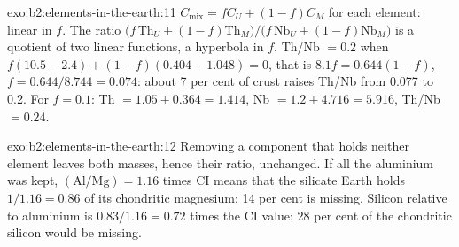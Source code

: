 \begin{solution}{exo:b2:elements-in-the-earth:11}
$C_{\mathrm{mix}} = fC_U + (1-f)C_M$ for each element: linear in $f$. The ratio
$\bigl(f\,\mathrm{Th}_U + (1-f)\mathrm{Th}_M\bigr)/\bigl(f\,\mathrm{Nb}_U +
(1-f)\mathrm{Nb}_M\bigr)$ is a quotient of two linear functions, a hyperbola in $f$.
Th/Nb $= 0.2$ when $f(10.5-2.4) + (1-f)(0.404-1.048) = 0$, that is $8.1f = 0.644(1-f)$,
$f = 0.644/8.744 = 0.074$: about 7 per cent of crust raises Th/Nb from 0.077 to 0.2. For
$f = 0.1$: Th $= 1.05 + 0.364 = 1.414$, Nb $= 1.2 + 4.716 = 5.916$, Th/Nb $= 0.24$.
\end{solution}

\begin{solution}{exo:b2:elements-in-the-earth:12}
Removing a component that holds neither element leaves both masses, hence their ratio,
unchanged. If all the aluminium was kept, $(\mathrm{Al}/\mathrm{Mg}) = 1.16$ times CI
means that the silicate Earth holds $1/1.16 = 0.86$ of its chondritic magnesium: 14 per
cent is missing. Silicon relative to aluminium is $0.83/1.16 = 0.72$ times the CI value:
28 per cent of the chondritic silicon would be missing.
\end{solution}

